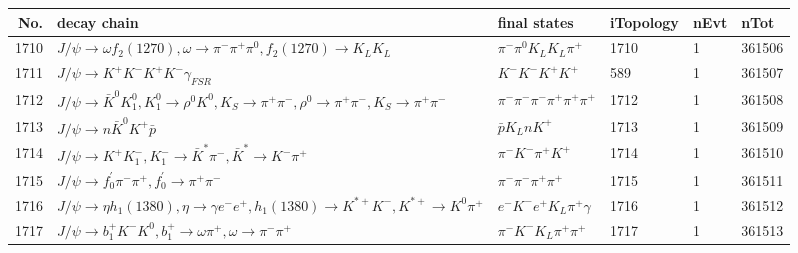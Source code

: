 \begin{table}[htbp] 
\begin{center}
\begin{small}
\begin{tabular}{rlllll}\hline\hline
 No. & decay chain & final states &  iTopology & nEvt & nTot \\\hline
1710&$J/\psi       \rightarrow \omega         f_{2}(1270)    , \omega          \rightarrow \pi^{-}        \pi^{+}        \pi^{0}        , f_{2}(1270)     \rightarrow K_{L}          K_{L}          $&$\pi^{-}        \pi^{0}        K_{L}          K_{L}          \pi^{+}        $& 1710&    1&361506\\
1711&$J/\psi       \rightarrow K^{+}          K^{-}          K^{+}          K^{-}          \gamma_{FSR} $&$K^{-}          K^{-}          K^{+}          K^{+}          $&  589&    1&361507\\
1712&$J/\psi       \rightarrow \bar{K}^{0}   K_1^{0}        , K_1^{0}         \rightarrow \rho^{0}      K^{0}          , K_{S}           \rightarrow \pi^{+}        \pi^{-}        , \rho^{0}       \rightarrow \pi^{+}        \pi^{-}        , K_{S}           \rightarrow \pi^{+}        \pi^{-}        $&$\pi^{-}        \pi^{-}        \pi^{-}        \pi^{+}        \pi^{+}        \pi^{+}        $& 1712&    1&361508\\
1713&$J/\psi       \rightarrow n                 \bar{K}^{0}   K^{+}          \bar{p}          $&$\bar{p}          K_{L}          n                 K^{+}          $& 1713&    1&361509\\
1714&$J/\psi       \rightarrow K^{+}          K_{1}^{-}      , K_{1}^{-}       \rightarrow \bar{K}^{*}   \pi^{-}        , \bar{K}^{*}    \rightarrow K^{-}          \pi^{+}        $&$\pi^{-}        K^{-}          \pi^{+}        K^{+}          $& 1714&    1&361510\\
1715&$J/\psi       \rightarrow f^{'}_{0}     \pi^{-}        \pi^{+}        , f^{'}_{0}      \rightarrow \pi^{+}        \pi^{-}        $&$\pi^{-}        \pi^{-}        \pi^{+}        \pi^{+}        $& 1715&    1&361511\\
1716&$J/\psi       \rightarrow \eta          h_{1}(1380)    , \eta           \rightarrow \gamma       e^{-}        e^{+}        , h_{1}(1380)     \rightarrow K^{*+}         K^{-}          , K^{*+}          \rightarrow K^{0}          \pi^{+}        $&$e^{-}        K^{-}          e^{+}        K_{L}          \pi^{+}        \gamma       $& 1716&    1&361512\\
1717&$J/\psi       \rightarrow b_{1}^{+}      K^{-}          K^{0}          , b_{1}^{+}       \rightarrow \omega         \pi^{+}        , \omega          \rightarrow \pi^{-}        \pi^{+}        $&$\pi^{-}        K^{-}          K_{L}          \pi^{+}        \pi^{+}        $& 1717&    1&361513\\

\end{tabular}
\end{small}
\end{center}
\end{table}
